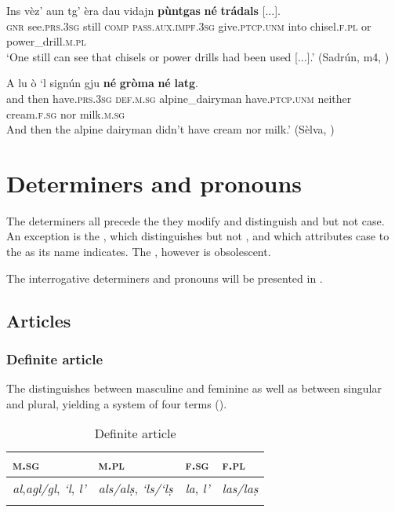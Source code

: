 \ea
\label{ex:neor1}
\gll Ins vèz’ aun tg’ èra dau vidajn \textbf{pùntgas} \textbf{né} \textbf{trádals} [...].\\
\textsc{gnr} see.\textsc{prs.3sg} still \textsc{comp} \textsc{pass.aux.impf.3sg} give.\textsc{ptcp.unm} into chisel.\textsc{f.pl} or power\_drill.\textsc{m.pl}\\
\glt `One still can see that chisels or power drills had been used [...].' (Sadrún, m4, )
\z

\ea
\label{ex:nene1}
\gll A lu ò `l signún gju \textbf{né} \textbf{gròma} \textbf{né} \textbf{latg}.\\
and then have.\textsc{prs.3sg} \textsc{def.m.sg} alpine\_dairyman have.\textsc{ptcp.unm} neither cream.\textsc{f.sg} nor milk.\textsc{m.sg}\\
\glt And then the alpine dairyman didn't have cream nor milk.' (Sèlva, \citealt[47]{Büchli1966})
\z


\section{Determiners and pronouns}\label{sec:3.2}
The determiners all precede the  they modify and distinguish  and  but not case. An exception is the , which distinguishes  but not , and which attributes case to the  as its name indicates. The , however is obsolescent.

The interrogative determiners and pronouns will be presented in .

\subsection{Articles}\label{sec:3.2.1}

\subsubsection{Definite article}\label{sec:3.2.1.1}
The  distinguishes between masculine and feminine as well as between singular and plural, yielding a system of four terms ().

\begin{table}
\caption{Definite article}
\label{tab:1:defart}
 \begin{tabular}{llll}
  \lsptoprule
   \textsc{m.sg}   &  \textsc{m.pl} & \textsc{f.sg} & \textsc{f.pl}\\ 
  \midrule
  \textit{al},\textit{agl/gl}, \textit{`l}, \textit{l'} & \textit{als/alṣ}, \textit{`ls/`lṣ} & \textit{la}, \textit{l'} &  \textit{las/laṣ}\\
\lspbottomrule
\end{tabular}
\end{table}

